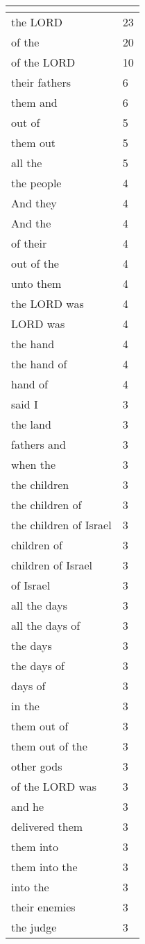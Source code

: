 \begin{center}
\begin{longtable}{|p{3.0in}|p{0.5in}|}
\hline \multicolumn{2}{c}{{ }} \\ \hline
\endfoot 
the LORD & 23\\ \hline 
of the & 20\\ \hline 
of the LORD & 10\\ \hline 
their fathers & 6\\ \hline 
them and & 6\\ \hline 
out of & 5\\ \hline 
them out & 5\\ \hline 
all the & 5\\ \hline 
the people & 4\\ \hline 
And they & 4\\ \hline 
And the & 4\\ \hline 
of their & 4\\ \hline 
out of the & 4\\ \hline 
unto them & 4\\ \hline 
the LORD was & 4\\ \hline 
LORD was & 4\\ \hline 
the hand & 4\\ \hline 
the hand of & 4\\ \hline 
hand of & 4\\ \hline 
said I & 3\\ \hline 
the land & 3\\ \hline 
fathers and & 3\\ \hline 
when the & 3\\ \hline 
the children & 3\\ \hline 
the children of & 3\\ \hline 
the children of Israel & 3\\ \hline 
children of & 3\\ \hline 
children of Israel & 3\\ \hline 
of Israel & 3\\ \hline 
all the days & 3\\ \hline 
all the days of & 3\\ \hline 
the days & 3\\ \hline 
the days of & 3\\ \hline 
days of & 3\\ \hline 
in the & 3\\ \hline 
them out of & 3\\ \hline 
them out of the & 3\\ \hline 
other gods & 3\\ \hline 
of the LORD was & 3\\ \hline 
and he & 3\\ \hline 
delivered them & 3\\ \hline 
them into & 3\\ \hline 
them into the & 3\\ \hline 
into the & 3\\ \hline 
their enemies & 3\\ \hline 
the judge & 3\\ \hline 
\end{longtable}
\end{center}






